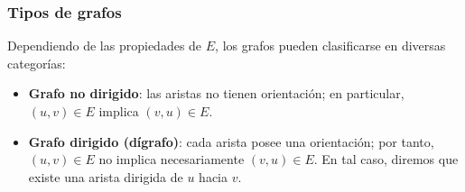    \subsubsection{Tipos de grafos}
        Dependiendo de las propiedades de $E$, los grafos pueden clasificarse en diversas categorías:

        \begin{itemize}
            \item \textbf{Grafo no dirigido}: las aristas no tienen orientación; en particular, $(u, v) \in E$ implica $(v, u) \in E$.

                \begin{center}
                \end{center}

            \item \textbf{Grafo dirigido (dígrafo)}: cada arista posee una orientación; por tanto, $(u, v) \in E$ no implica necesariamente $(v, u) \in E$. En tal caso, diremos que existe una arista dirigida de $u$ hacia $v$.

                \begin{center}
\end{center}
\end{itemize}
